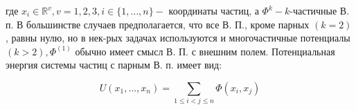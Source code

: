 \documentclass[10pt]{article}
\begin{document}
где $x_{i} \in \mathbb{R}^{v}, v=1,2,3, i \in\{1, \ldots, n\}-$ координаты частиц, а $\Phi^{k}-k$-частичные В. п. В большинстве случаев предполагается, что все В. П., кроме парных $(k=2)$, равны нулю, но в нек-рых задачах используются и многочастичные потенциалы $(k>2), \Phi^{(1)}$ обычно имеет смысл В. П. с внешним полем. Потенциальная энергия системы частиц с парным В. п. имеет вид:



\[

U\left(x_{1}, \ldots, x_{n}\right)=\sum_{1 \leqslant i<j \leqslant n} \Phi\left(x_{i}, x_{j}\right)

\]
\end{document}
